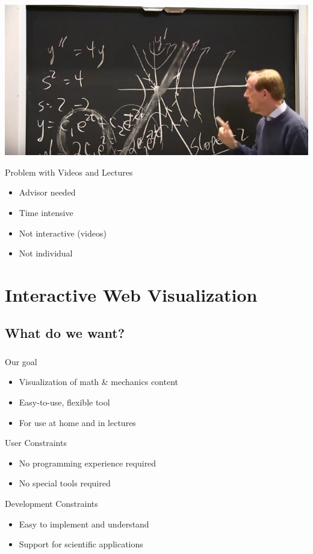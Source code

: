 \documentclass[11pt]{beamer}
\begin{document}
\begin{frame}
\frametitle{\insertsection}
\begin{center}
\includegraphics[width=.8\textwidth]{Pictures/Strang3.jpg}
\end{center}
\begin{block}{Problem with Videos and Lectures}
\begin{itemize}
\item Advisor needed
\item Time intensive
\item Not interactive (videos)
\item Not individual
\end{itemize}
\end{block}
\end{frame}

\section{Interactive Web Visualization}

\subsection{What do we want?}
\begin{frame}
\frametitle{\insertsubsection}
\begin{block}{Our goal}
\begin{itemize}
\item Visualization of math \& mechanics content
\item Easy-to-use, flexible tool
\item For use at home and in lectures
\end{itemize}
\end{block}
\pause
\begin{block}{User Constraints}
\begin{itemize}
\item No programming experience required
\item No special tools required
\end{itemize}
\end{block}
\pause
\begin{block}{Development Constraints}
\begin{itemize}
\item Easy to implement and understand
\item Support for scientific applications
\end{itemize}
\end{block}

\end{frame}
\end{document}
